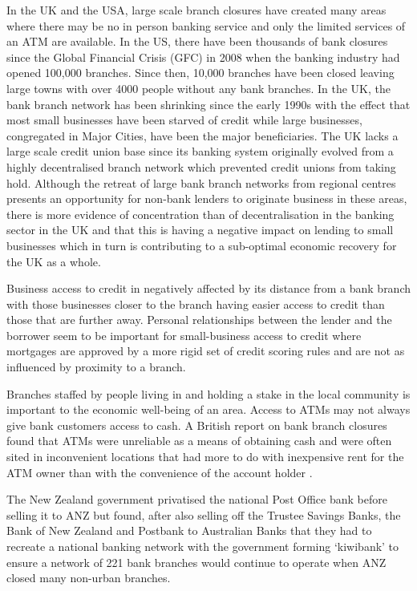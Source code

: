 In the UK and the USA, large scale branch closures have created many areas where there may be no in person banking service and only the limited services of an ATM are available. In the US, there have been thousands of bank closures since the Global Financial Crisis (GFC)  in 2008 when the banking industry had opened 100,000 branches. Since then, 10,000 branches have been closed leaving large towns with over 4000 people without any bank branches.\cite{RefWorks:395} In the UK, the bank branch network has been shrinking since the early 1990s with the effect that most small businesses have been starved of credit while large businesses, congregated in Major Cities, have been the major beneficiaries. The UK lacks a large scale credit union base since its banking system originally evolved from a highly decentralised branch network which prevented credit unions from taking hold\cite[p332]{RefWorks:402}. Although the retreat of large bank branch networks from regional centres presents an opportunity for non-bank lenders to originate business in these areas, there is more evidence of concentration than of decentralisation in the banking sector in the UK and that this is having a negative impact on lending to small businesses which in turn is contributing to a sub-optimal economic recovery for the UK as a whole\cite[p55-56]{RefWorks:403}.

Business access to credit in negatively affected by its distance from a bank branch with those businesses closer to the branch having easier access to credit than those that are further away. Personal relationships between the lender and the borrower seem to be important for small-business access to credit where mortgages are approved by a more rigid set of credit scoring rules and are not as influenced by proximity to a branch\cite{RefWorks:394}.

Branches staffed by people living in and holding a stake in the local community is important to the economic well-being of an area. Access to ATMs may not always give bank customers access to cash. A British report on bank branch closures found that ATMs were unreliable as a means of obtaining cash and were often sited in inconvenient locations that had more to do with inexpensive rent for the ATM owner than with the convenience of the account holder \cite[p16-18]{RefWorks:397}.

The New Zealand government privatised the national Post Office bank before selling it to ANZ but found, after also selling off the Trustee Savings Banks, the Bank of New Zealand and Postbank to Australian Banks that they had to recreate a national banking network with the government forming `kiwibank' to ensure a network of 221 bank branches would continue to operate when ANZ closed many non-urban branches\cite{RefWorks:377}.





